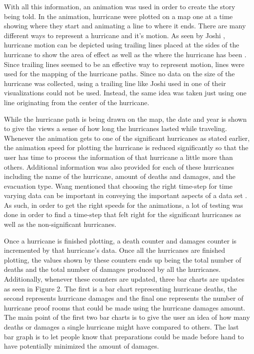 With  all this information, an animation was used in order to create the story being told. In the animation, hurricane were plotted on a map one at a time showing where they start and animating a line to where it ends. There are many different ways to represent a hurricane and it's motion. As seen by Joshi \etal, hurricane motion can be depicted using trailing lines placed at the sides of the hurricane to show the area of effect as well as the where the hurricane has been \cite{joshi2009case}. Since trailing lines seemed to be an effective way to represent motion, lines were used for the mapping of the hurricane paths. Since no data on the size of the hurricane was collected, using a trailing line like Joshi \etal used in one of their visualizations could not be used. Instead, the same idea was taken just using one line originating from the center of the hurricane. 

While the hurricane path is being drawn on the map, the date and year is shown to give the views a sense of how long the hurricanes lasted while traveling. Whenever the animation gets to one of the significant hurricanes as stated earlier, the animation speed for plotting the hurricane is reduced significantly so that the user has time to process the information of that hurricane a little more than others. Additional information was also provided for each of these hurricanes including the name of the hurricane, amount of deaths and damages, and the evacuation type. Wang \etal mentioned that choosing the right time-step for time varying data can be important in conveying the important aspects of a data set \cite{wang2008importance}. As such, in order to get the right speeds for the animations, a lot of testing was done in order to find a time-step that felt right for the significant hurricanes as well as the non-significant hurricanes.

Once a hurricane is finished plotting, a death counter and damages counter is incremented by that hurricane's data. Once all the hurricanes are finished plotting, the values shown by these counters ends up being the total number of deaths and the total number of damages produced by all the hurricanes. Additionally, whenever these counters are updated, three bar charts are updates as seen in Figure 2. The first is a bar chart representing hurricane deaths, the second represents hurricane damages and the final one represents the number of hurricane proof rooms that could be made using the hurricane damages amount. The main point of the first two bar charts is to give the user an idea of how many deaths or damages a single hurricane might have compared to others. The last bar graph is to let people know that preparations could be made before hand to have potentially minimized the amount of damages.

